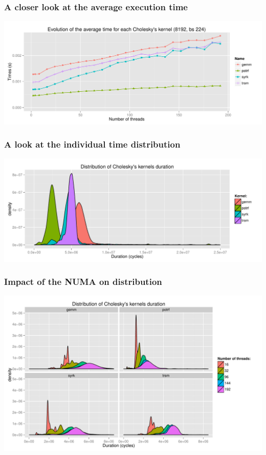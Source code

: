 \documentclass[xcolor={usenames,dvipsnames,svgnames,table}, aspectratio=43]{beamer}
\begin{document}
\begin{frame}
  \frametitle{A closer look at the average execution time}
  \begin{center}
    \includegraphics[width=\textwidth]{graph/graph_eval_kernels.pdf}
  \end{center}
\end{frame}

\begin{frame}
  \frametitle{A look at the individual time distribution}
  \begin{center}
    \includegraphics[width=\textwidth]{graph/graph_distrib.pdf}
  \end{center}
\end{frame}

\begin{frame}
  \frametitle{Impact of the NUMA on distribution}
  \begin{center}
    \includegraphics[width=\textwidth]{graph/graph_distrib_overview.pdf}
  \end{center}
\end{frame}
\end{document}
